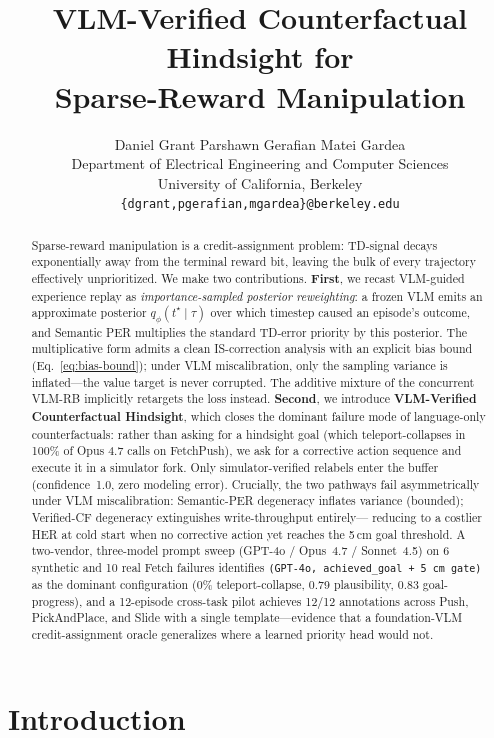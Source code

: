 \documentclass{article}
\title{VLM-Verified Counterfactual Hindsight for\\Sparse-Reward Manipulation}
\author{%
  Daniel Grant \quad Parshawn Gerafian \quad Matei Gardea \\
  Department of Electrical Engineering and Computer Sciences \\
  University of California, Berkeley \\
  \texttt{\{dgrant,pgerafian,mgardea\}@berkeley.edu}
}
\begin{document}
\maketitle

\begin{abstract}
Sparse-reward manipulation is a credit-assignment problem: TD-signal decays
exponentially away from the terminal reward bit, leaving the bulk of every
trajectory effectively unprioritized. We make two contributions.
\textbf{First}, we recast VLM-guided experience replay as
\emph{importance-sampled posterior reweighting}: a frozen VLM emits an
approximate posterior $q_\phi(t^\star\!\mid\!\tau)$ over which timestep caused
an episode's outcome, and Semantic PER multiplies the standard TD-error
priority by this posterior. The multiplicative form admits a clean
IS-correction analysis with an explicit bias bound
(Eq.~\ref{eq:bias-bound}); under VLM miscalibration, only the
sampling variance is inflated---the value target is never corrupted.
The additive mixture of the concurrent VLM-RB
\citep{sharony2026vlmrb} implicitly retargets the loss instead.
\textbf{Second}, we introduce \textbf{VLM-Verified Counterfactual Hindsight},
which closes the dominant failure mode of language-only counterfactuals:
rather than asking for a hindsight goal (which teleport-collapses in 100\%
of Opus 4.7 calls on FetchPush), we ask for a corrective action sequence and
execute it in a simulator fork. Only simulator-verified relabels enter the
buffer (confidence~1.0, zero modeling error).
Crucially, the two pathways fail asymmetrically under VLM
miscalibration: Semantic-PER degeneracy inflates variance (bounded);
Verified-CF degeneracy extinguishes write-throughput entirely---
reducing to a costlier HER at cold start when no corrective action
yet reaches the 5\,cm goal threshold.
A two-vendor, three-model prompt sweep
(GPT-4o / Opus~4.7 / Sonnet~4.5) on 6 synthetic and 10 real Fetch failures identifies
\texttt{(GPT-4o, achieved\_goal + 5\,cm gate)} as the dominant configuration (0\%
teleport-collapse, 0.79 plausibility, 0.83 goal-progress), and a 12-episode
cross-task pilot achieves 12/12 annotations across Push, PickAndPlace, and
Slide with a single template---evidence that a foundation-VLM
credit-assignment oracle generalizes where a learned priority head would not.
\end{abstract}

\section{Introduction}
\label{sec:intro}
\end{document}
